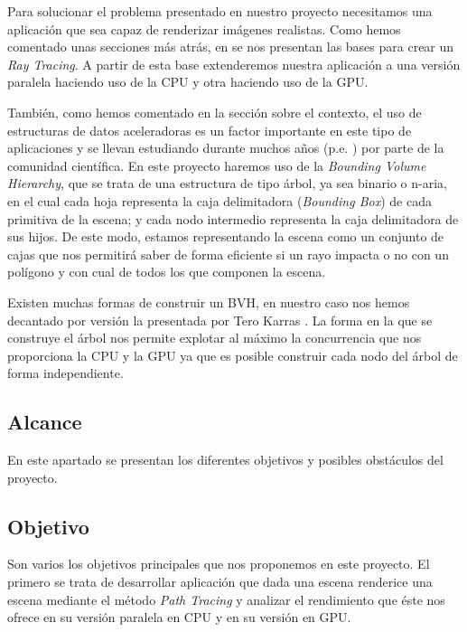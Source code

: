 \documentclass[titlepage,12pt]{report}
\begin{document}
Para solucionar el problema presentado en nuestro proyecto necesitamos una aplicación que sea capaz de renderizar imágenes realistas. Como hemos comentado unas secciones más atrás, en \cite{Shirley2018a, Shirley2018b, Shirley2018c} se nos presentan las bases para crear un \textit{Ray Tracing}. A partir de esta base extenderemos nuestra aplicación a una versión paralela haciendo uso de la CPU y otra haciendo uso de la GPU.

También, como hemos comentado en la sección sobre el contexto, el uso de estructuras de datos aceleradoras es un factor importante en este tipo de aplicaciones y se llevan estudiando durante muchos años (p.e. \cite{Rubin1980}) por parte de la comunidad científica. En este proyecto haremos uso de la \textit{Bounding Volume Hierarchy}, que se trata de una estructura de tipo árbol, ya sea binario o n-aria, en el cual cada hoja representa la caja delimitadora (\textit{Bounding Box}) de cada primitiva de la escena; y cada nodo intermedio representa la caja delimitadora de sus hijos. De este modo, estamos representando la escena como un conjunto de cajas que nos permitirá saber de forma eficiente si un rayo impacta o no con un polígono y con cual de todos los que componen la escena.

Existen muchas formas de construir un BVH, en nuestro caso nos hemos decantado por versión la presentada por Tero Karras \cite{Karras2012, Karras2013}. La forma en la que se construye el árbol nos permite explotar al máximo la concurrencia que nos proporciona la CPU y la GPU ya que es posible construir cada nodo del árbol de forma independiente. 

\subsection{Alcance}

En este apartado se presentan los diferentes objetivos y posibles obstáculos del proyecto.

\subsection{Objetivo}

Son varios los objetivos principales que nos proponemos en este proyecto. El primero se trata de desarrollar aplicación que dada una escena renderice una escena mediante el método \textit{Path Tracing} y analizar el rendimiento que éste nos ofrece en su versión paralela en CPU y en su versión en GPU.
\end{document}
